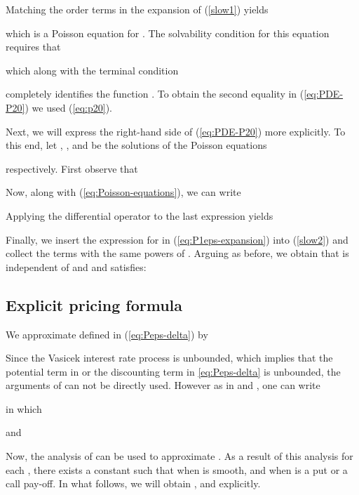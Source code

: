 \documentclass[11pt]{article}
\numberwithin{equation}{section}
\begin{document}
Matching the  order terms in the expansion of (\ref{slow1}) yields

which is a Poisson equation for . The solvability
condition for this equation requires that

which along with the terminal condition 

completely identifies the function .
To obtain the second equality in (\ref{eq:PDE-P20}) we used (\ref{eq:p20}).

Next, we will express the right-hand side of (\ref{eq:PDE-P20}) more explicitly. To this end, 
 let , , and  be the solutions of the Poisson equations

respectively.
First observe that

Now, along with (\ref{eq:Poisson-equations}), we can write

Applying the differential operator  to the last expression yields 


Finally, we insert the expression for  in (\ref{eq:P1eps-expansion}) into (\ref{slow2}) and collect the terms with the same powers of . Arguing as before, we obtain that
 is independent of
 and  and satisfies:


\subsection{Explicit pricing formula}\label{sec:explct}

We approximate  defined in (\ref{eq:Peps-delta}) by

Since the Vasicek interest rate process is unbounded, which implies that the potential term in  or the discounting term in \eqref{eq:Peps-delta} is unbounded, the arguments of 
 \cite{ronnie-timescale} can not be directly used. However as in \cite{MR2046929} and \cite{papa}, one can write
 
in which 

and

 Now, the analysis of  \cite{ronnie-timescale} can be used to approximate .
 As a result of this analysis for each , there exists a constant  such that
 when  is smooth, and
 when  is a put or a call pay-off. In what follows, we will obtain ,  and  explicitly.
\end{document}

